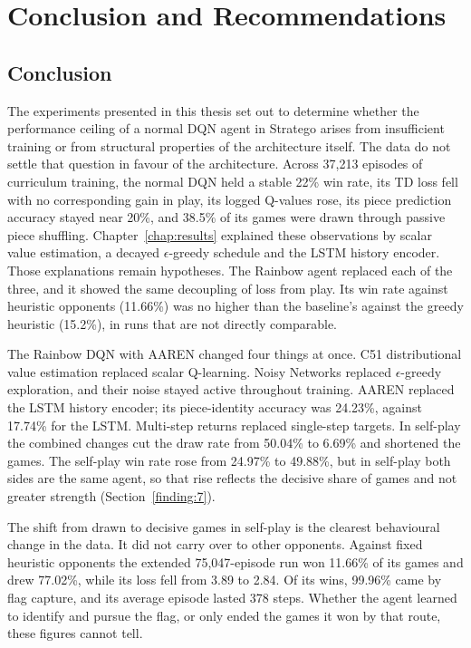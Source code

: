\chapter{Conclusion and Recommendations}\label{chap:recommendations}

\section{Conclusion}

The experiments presented in this thesis set out to determine whether the performance ceiling of a normal DQN agent in Stratego arises from insufficient training or from structural properties of the architecture itself. The data do not settle that question in favour of the architecture. Across 37,213 episodes of curriculum training, the normal DQN held a stable 22\% win rate, its TD loss fell with no corresponding gain in play, its logged Q-values rose, its piece prediction accuracy stayed near 20\%, and 38.5\% of its games were drawn through passive piece shuffling. Chapter~\ref{chap:results} explained these observations by scalar value estimation, a decayed $\epsilon$-greedy schedule and the LSTM history encoder. Those explanations remain hypotheses. The Rainbow agent replaced each of the three, and it showed the same decoupling of loss from play. Its win rate against heuristic opponents (11.66\%) was no higher than the baseline's against the greedy heuristic (15.2\%), in runs that are not directly comparable.

The Rainbow DQN with AAREN changed four things at once. C51 distributional value estimation replaced scalar Q-learning. Noisy Networks replaced $\epsilon$-greedy exploration, and their noise stayed active throughout training. AAREN replaced the LSTM history encoder; its piece-identity accuracy was 24.23\%, against 17.74\% for the LSTM. Multi-step returns replaced single-step targets. In self-play the combined changes cut the draw rate from 50.04\% to 6.69\% and shortened the games. The self-play win rate rose from 24.97\% to 49.88\%, but in self-play both sides are the same agent, so that rise reflects the decisive share of games and not greater strength (Section~\ref{finding:7}).

The shift from drawn to decisive games in self-play is the clearest behavioural change in the data. It did not carry over to other opponents. Against fixed heuristic opponents the extended 75,047-episode run won 11.66\% of its games and drew 77.02\%, while its loss fell from 3.89 to 2.84. Of its wins, 99.96\% came by flag capture, and its average episode lasted 378 steps. Whether the agent learned to identify and pursue the flag, or only ended the games it won by that route, these figures cannot tell.

